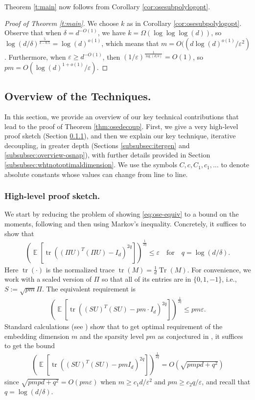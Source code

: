 \documentclass[11pt]{amsart}
\numberwithin{equation}{section}
\numberwithin{equation}{section}
\DeclareMathOperator{\E}{\mathbb{E}}
\DeclareMathOperator*{\tr}{tr}
\DeclareMathOperator*{\Tr}{Tr}
\begin{document}
 Theorem \ref{t:main} now follows from Corollary \ref{cor:osesubpolylogopt}.  

\begin{proof}[Proof of Theorem \ref{t:main}]
We choose $k$ as in Corollary \ref{cor:osesubpolylogopt}. Observe that when $\delta= d^{-O(1)}$, we have $k=\Omega(\log\log\log(d))$, so $\log(d/\delta)^\frac{5}{k - 0.5} = \log(d)^{o(1)}$, which means that $m= O((d\log(d)^{o(1)}/\varepsilon^2)$. Furthermore,  when $\varepsilon \ge d^{-O(1)}$, then  $(1/\varepsilon)^\frac{1}{\log(d/\delta)} = O(1)$, so $pm = O(\log(d)^{1+o(1)}/\varepsilon)$.
\end{proof}

\subsection{Overview of the Techniques.}\label{sec:overview}

In this section, we provide an overview of our key technical contributions that lead to the proof of Theorem \ref{thm:osedecoup}. First, we give a very high-level proof sketch (Section \ref{subsubsec:momest}), and then we explain our key technique, iterative decoupling, in greater depth (Sections \ref{subsubsec:itergen} and \ref{subsubsec:overview-osnap}), with further details provided in Section \ref{subsubsec:whtnotoptimaldimension}. We use the symbols $C, c, C_1, c_1, \ldots$ to denote absolute constants whose values can change from line to line.

\subsubsection{High-level proof sketch.} \label{subsubsec:momest}


We start by reducing the problem of showing \eqref{eq:ose-equiv} to a bound on the moments, following \cite{nelson2013osnap, chenakkod2025optimal} and then using Markov's inequality. Concretely, it suffices to show that
\begin{align*}
    \left( \E[\tr((\Pi U)^T(\Pi U)-I_{d })^{2q}] \right)^{\frac{1}{2q}} \le \varepsilon\quad\text{for}\quad q=\log(d/\delta).
\end{align*}
Here $\tr(\cdot)$ is the normalized trace $\tr(M)=\frac {1}{d}\Tr(M)$.  For convenience, we work with a scaled version of $\Pi$ so that all of its entries are in $\{0,1,-1\}$, i.e., $S:=\sqrt{pm} \Pi$. The equivalent requirement is
\begin{align*}
    \left( \E[\tr((S U)^T(S U)-pm \cdot I_{d })^{2q}] \right)^{\frac{1}{2q}} \le pm\varepsilon.
\end{align*}
 Standard calculations (see \cite{nelson2013osnap,chenakkod2024optimal, chenakkod2025optimal}) show that to get optimal requirement of the embedding dimension $m$ and the sparsity level $pm$ as conjectured in \cite{nelson2013osnap}, it suffices to get the bound 
\begin{align*}
    \left( \E[\tr((S U)^T(S U)-pm I_{d })^{2q}] \right)^{\frac{1}{2q}} =O(\sqrt{pmpd+q^2})
\end{align*}
since $\sqrt{pmpd+q^2} = O(pm\varepsilon)$ when $m \ge c_1d/\varepsilon^2$ and $pm \ge c_2q/\varepsilon$, and recall that $q=\log(d/\delta)$.
\end{document}
